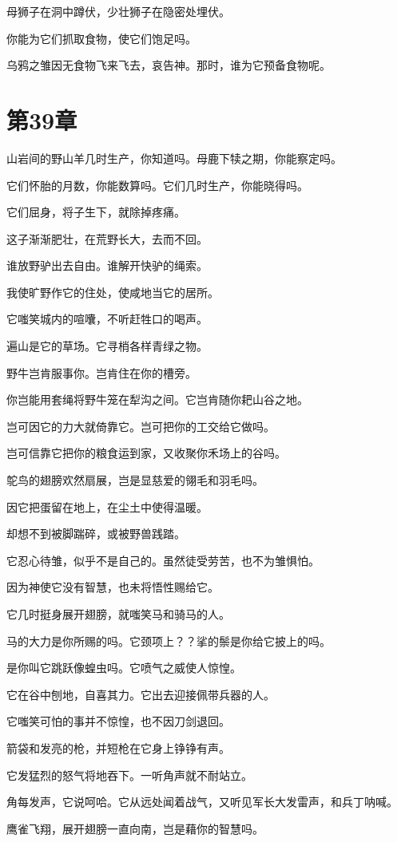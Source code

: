 \documentclass[12pt,oneside]{book}
\begin{document}
母狮子在洞中蹲伏，少壮狮子在隐密处埋伏。

你能为它们抓取食物，使它们饱足吗。

乌鸦之雏因无食物飞来飞去，哀告神。那时，谁为它预备食物呢。


\chapter{第39章}
山岩间的野山羊几时生产，你知道吗。母鹿下犊之期，你能察定吗。

它们怀胎的月数，你能数算吗。它们几时生产，你能晓得吗。

它们屈身，将子生下，就除掉疼痛。

这子渐渐肥壮，在荒野长大，去而不回。

谁放野驴出去自由。谁解开快驴的绳索。

我使旷野作它的住处，使咸地当它的居所。

它嗤笑城内的喧囔，不听赶牲口的喝声。

遍山是它的草场。它寻梢各样青绿之物。

野牛岂肯服事你。岂肯住在你的槽旁。

你岂能用套绳将野牛笼在犁沟之间。它岂肯随你耙山谷之地。

岂可因它的力大就倚靠它。岂可把你的工交给它做吗。

岂可信靠它把你的粮食运到家，又收聚你禾场上的谷吗。

鸵鸟的翅膀欢然扇展，岂是显慈爱的翎毛和羽毛吗。

因它把蛋留在地上，在尘土中使得温暖。

却想不到被脚踹碎，或被野兽践踏。

它忍心待雏，似乎不是自己的。虽然徒受劳苦，也不为雏惧怕。

因为神使它没有智慧，也未将悟性赐给它。

它几时挺身展开翅膀，就嗤笑马和骑马的人。

马的大力是你所赐的吗。它颈项上？？挲的鬃是你给它披上的吗。

是你叫它跳跃像蝗虫吗。它喷气之威使人惊惶。

它在谷中刨地，自喜其力。它出去迎接佩带兵器的人。

它嗤笑可怕的事并不惊惶，也不因刀剑退回。

箭袋和发亮的枪，并短枪在它身上铮铮有声。

它发猛烈的怒气将地吞下。一听角声就不耐站立。

角每发声，它说呵哈。它从远处闻着战气，又听见军长大发雷声，和兵丁呐喊。

鹰雀飞翔，展开翅膀一直向南，岂是藉你的智慧吗。
\end{document}
